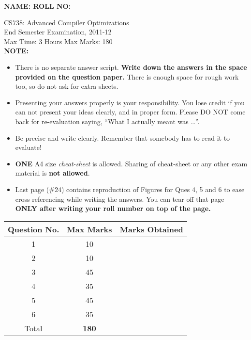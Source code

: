 \documentclass[12pt]{article}
\begin{document}
{\Large\bf NAME: \hspace*{3in} ROLL NO:}

\begin{center}
CS738: Advanced Compiler Optimizations \\
End Semester Examination, 2011-12\\
Max Time: 3 Hours  \hfill Max Marks: 180 \\

{\bf NOTE: }
\begin{itemize}

\item There is no separate answer script. {\bf Write down the
  answers in the space provided on the question paper.} There
  is enough space for rough work too, so do not ask for extra
  sheets. \\

\item Presenting your answers properly is your
  responsibility. You lose credit if you can not present your
  ideas clearly, and in proper form. Please DO NOT come back
  for re-evaluation saying, ``What I actually meant was
  \ldots''.

\item Be precise and write clearly. Remember that somebody
  has to read it to evaluate!

\item {\bf ONE} A4 size {\em cheat-sheet} is allowed. Sharing
  of cheat-sheet or any other exam material is {\bf not
    allowed}. 

\item Last page (\#24) contains reproduction of Figures for
  Ques 4, 5 and 6 to ease cross referencing while writing the
  answers. You can tear off that page {\bf ONLY after writing
    your roll number on top of the page.} 
\end{itemize}



\vspace*{4mm}

{\Large
\begin{tabular}{|c|c|c|}\hline
Question No. & Max Marks & Marks Obtained \\\hline
1 & 10 & \\\hline
2 & 10 & \\\hline
3 & 45 & \\\hline
4 & 35 & \\\hline
5 & 45 & \\\hline
6 & 35 & \\\hline
Total & \bf{180} & \\\hline
\end{tabular}
}
\end{center}
\end{document}
